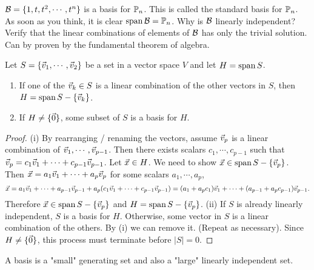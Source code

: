 \documentclass[10pt,a4paper]{article}
\begin{document}
\begin{example}
	$\mathcal{B} = \{1,t,t^2,\cdots,t^n\}$ is a basis for $\mathbb{P}_n$. This is called the standard basis for $\mathbb{P}_n$. As soon as you think, it is clear $\text{span}\,\mathcal{B} = \mathbb{P}_n$. Why is $\mathcal{B}$ linearly independent? Verify that the linear combinations of elements of $\mathcal{B}$ has only the trivial solution. Can by proven by the fundamental theorem of algebra.
\end{example}

\begin{theorem}
	Let $S = \{\vec{v}_1,\cdots,\vec{v}_2\}$ be a set in a vector space $V$ and let $H = \text{span}\,S$.
	\begin{enumerate}
		\item[(i)] If one of the $\vec{v}_k\in S$ is a linear combination of the other vectors in $S$, then $H = \text{span}\,S - \{\vec{v}_k\}$.
		\item[(ii)] If $H\neq \{\vec{0}\}$, some subset of $S$ is a basis for $H$.
	\end{enumerate}
\end{theorem}
\begin{proof}
	(i) By rearranging / renaming the vectors, assume $\vec{v}_p$ is a linear combination of $\vec{v}_1,\cdots,\vec{v}_{p-1}$. Then there exists scalars $c_1,\cdots,c_{p-1}$ such that $\vec{v}_p = c_1\vec{v}_1 + \cdots + c_{p-1} \vec{v}_{p-1}$. Let $\vec{x}\in H$. We need to show $\vec{x}\in \text{span}\,S - \{\vec{v}_p\}$. Then $\vec{x} = a_1 \vec{v}_1 + \cdots + a_p \vec{v}_p$ for some scalars $a_1,\cdots,a_p$, 
	$$\vec{x} = a_1\vec{v}_1 + \cdots + a_{p-1} \vec{v}_{p-1} + a_p (c_1 \vec{v}_1 + \cdots + c_{p-1} \vec{v}_{p-1}) = (a_1 + a_p c_1) \vec{v}_1 + \cdots + (a_{p-1} + a_p c_{p-1})\vec{v}_{p-1}.$$
	Therefore $\vec{x} \in \text{span}\,S - \{\vec{v}_p\}$ and $H = \text{span}\,S-\{\vec{v}_p\}$.
	(ii) If $S$ is already linearly independent, $S$ is a basis for $H$. Otherwise, some vector in $S$ is a linear combination of the others. By (i) we can remove it. (Repeat as necessary). Since $H\neq\{\vec{0}\}$, this process must terminate before $|S| = 0$.
\end{proof}
\begin{remark}
	A basis is a "small" generating set and also a "large" linearly independent set.
\end{remark}
\end{document}
